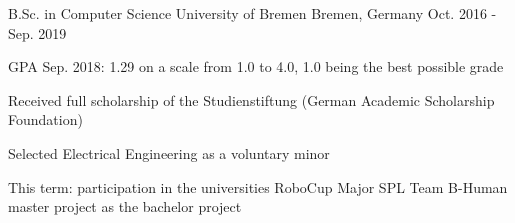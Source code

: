 

\begin{cventries}

  \cventry
    {B.Sc. in Computer Science} %
    {University of Bremen} %
    {Bremen, Germany} %
    {Oct. 2016 - Sep. 2019} %
    {
      \begin{cvitems} %
        \item {GPA Sep. 2018: 1.29 on a scale from 1.0 to 4.0, 1.0 being the best possible grade}
        \item {Received full scholarship of the Studienstiftung (German Academic Scholarship Foundation)}
        \item {Selected Electrical Engineering as a voluntary minor}
        \item {This term: participation in the universities RoboCup Major SPL Team B-Human master project as the bachelor project}        
      \end{cvitems}
    }
    
\begin{comment}
  \cventry
    {Abitur} %
    {Gymnasium Damme} %
    {Damme, Germany} %
    {Jul. 2007 - Jul. 2015} %
    {
      \begin{cvitems} %
        \item {GPA: 1.8 on a scale from 1.0 to 4.0, 1.0 being the best possible grade}
        \item {Scientific profile (Physics, Math, English, Geography, Computer Science)}
      \end{cvitems}
    }
\end{comment}

\end{cventries}
